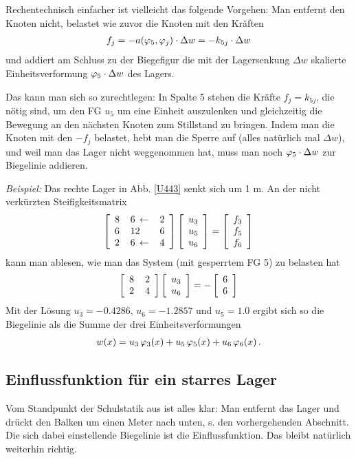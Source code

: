 {{{Rechentechnisch einfacher ist vielleicht das folgende Vorgehen: Man entfernt den Knoten nicht, belastet wie zuvor die Knoten mit den Kr\"{a}ften
\begin{align}
f_j = -a(\varphi_5,\varphi_j) \cdot \Delta w= - k_{5j} \cdot \Delta w
\end{align}
und addiert am Schluss zu der Biegefigur die mit der Lagersenkung $\Delta w$ skalierte Einheitsverformung $\varphi_5 \cdot \Delta w$ des Lagers.

Das kann man sich so zurechtlegen: In Spalte 5 stehen die Kr\"{a}fte $f_j = k_{5j}$, die n\"{o}tig sind, um den FG $u_5$ um eine Einheit auszulenken und gleichzeitig die Bewegung an den n\"{a}chsten Knoten zum Stillstand zu bringen. Indem man die Knoten mit den $-f_j$ belastet, hebt man die Sperre auf (alles nat\"{u}rlich mal $\Delta w$), und weil man das Lager nicht weggenommen hat, muss man noch $\varphi_5 \cdot \Delta w$ zur Biegelinie addieren.

{\em Beispiel:\/} Das rechte Lager in Abb. \ref{U443} senkt sich um 1 m. An der nicht verk\"{u}rzten Steifigkeitsmatrix
\begin{align}
\left[ \barr{l  @{\hspace{4mm}}l   @{\hspace{4mm}}l} 8 &6\,\leftarrow &2 \\ 6 &12 &6 \\ 2 & 6\,\leftarrow &4 \earr \right] \left[ \barr{c} u_3 \\u_5 \\u_6 \earr\right] = \left[ \barr{c} f_3 \\f_5 \\f_6 \earr\right]
\end{align}
kann man ablesen, wie man das System (mit gesperrtem FG 5) zu belasten hat
\begin{align}
\left[ \barr{c  @{\hspace{4mm}}c} 8 &2 \\ 2  &4 \earr \right] \left[ \barr{c} u_3 \\u_6 \earr\right] = -\left[ \barr{c} 6 \\6 \earr\right]
\end{align}
Mit der L\"{o}sung $u_3 = -0.4286$, $u_6 = -1.2857$ und $u_5 = 1.0$ ergibt sich so die Biegelinie als die Summe der drei Einheitsverformungen
\begin{align}
w(x) = u_3\,\varphi_3(x) + u_5\,\varphi_5(x) + u_6\,\varphi_6(x)\,.
\end{align}

{\textcolor{sectionTitleBlue}{\section{Einflussfunktion f\"{u}r ein starres Lager}}}
Vom Standpunkt der \glq Schulstatik\grq{} aus ist alles klar: Man entfernt das Lager und dr\"{u}ckt den Balken um einen Meter nach unten, s. den vorhergehenden Abschnitt. Die sich dabei einstellende Biegelinie ist die Einflussfunktion. Das bleibt nat\"{u}rlich weiterhin richtig.

}}}
